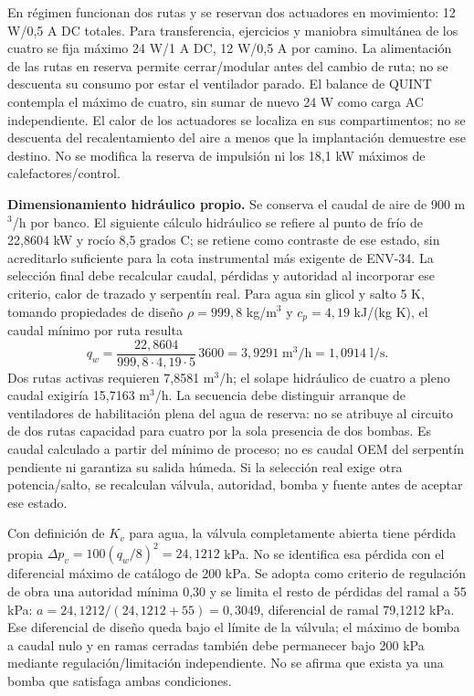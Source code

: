 En régimen funcionan dos rutas y se reservan dos actuadores en movimiento: 12 W/0,5 A DC totales. Para transferencia, ejercicios y maniobra simultánea de los cuatro se fija máximo 24 W/1 A DC, 12 W/0,5 A por camino. La alimentación de las rutas en reserva permite cerrar/modular antes del cambio de ruta; no se descuenta su consumo por estar el ventilador parado. El balance de QUINT contempla el máximo de cuatro, sin sumar de nuevo 24 W como carga AC independiente. El calor de los actuadores se localiza en sus compartimentos; no se descuenta del recalentamiento del aire a menos que la implantación demuestre ese destino. No se modifica la reserva de impulsión ni los 18,1 kW máximos de calefactores/control.

\textbf{Dimensionamiento hidráulico propio.} Se conserva el caudal de aire de 900 m$^3$/h por banco. El siguiente cálculo hidráulico se refiere al punto de frío de 22,8604 kW y rocío 8,5 grados C; se retiene como contraste de ese estado, sin acreditarlo suficiente para la cota instrumental más exigente de ENV-34. La selección final debe recalcular caudal, pérdidas y autoridad al incorporar ese criterio, calor de trazado y serpentín real. Para agua sin glicol y salto 5 K, tomando propiedades de diseño $\rho=999,8$ kg/m$^3$ y $c_p=4,19$ kJ/(kg K), el caudal mínimo por ruta resulta
\[
q_w=\frac{22,8604}{999,8\cdot4,19\cdot5}\,3600=3,9291\;\mathrm{m^3/h}=1,0914\;\mathrm{l/s}.
\]
Dos rutas activas requieren 7,8581 m$^3$/h; el solape hidráulico de cuatro a pleno caudal exigiría 15,7163 m$^3$/h. La secuencia debe distinguir arranque de ventiladores de habilitación plena del agua de reserva: no se atribuye al circuito de dos rutas capacidad para cuatro por la sola presencia de dos bombas. Es caudal calculado a partir del mínimo de proceso; no es caudal OEM del serpentín pendiente ni garantiza su salida húmeda. Si la selección real exige otra potencia/salto, se recalculan válvula, autoridad, bomba y fuente antes de aceptar ese estado.

Con definición de $K_v$ para agua, la válvula completamente abierta tiene pérdida propia $\Delta p_v=100(q_w/8)^2=24,1212$ kPa. No se identifica esa pérdida con el diferencial máximo de catálogo de 200 kPa. Se adopta como criterio de regulación de obra una autoridad mínima 0,30 y se limita el resto de pérdidas del ramal a 55 kPa: $a=24,1212/(24,1212+55)=0,3049$, diferencial de ramal 79,1212 kPa. Ese diferencial de diseño queda bajo el límite de la válvula; el máximo de bomba a caudal nulo y en ramas cerradas también debe permanecer bajo 200 kPa mediante regulación/limitación independiente. No se afirma que exista ya una bomba que satisfaga ambas condiciones.

